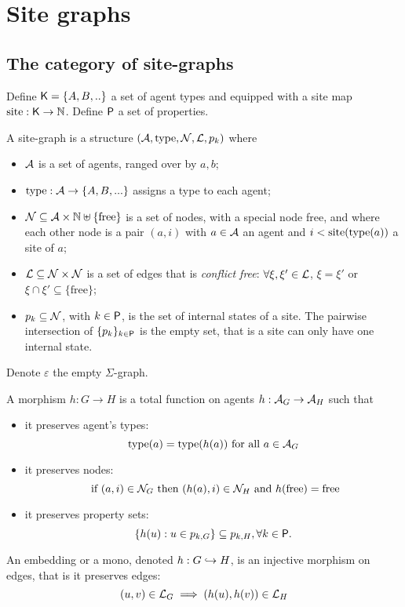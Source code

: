 \section{Site graphs}

\subsection{The category of site-graphs}

Define $\mathsf{K} = \{A, B,..\}$ a set of agent types %
and equipped with a site map $\operatorname{site}:\mathsf{K}\to\mathbb{N}$.
Define $\mathsf{P}$ a set of properties.


\begin{definition}
\label{def:site_graphs}
A site-graph is a structure $(\mathcal{A},\operatorname{type},\mathcal{N},\mathcal{L},p_k)$ where
\begin{itemize}
\item $\mathcal{A}$ is a set of agents, ranged over by $a,b$;
\item $\operatorname{type}:\mathcal{A}\to \{A, B,...\}$ assigns a type to each agent;
\item $\mathcal{N}\subseteq \mathcal{A}\times\mathbb{N}\uplus\{\text{free}\}$ is a set of nodes, with a special node free, and where each other node is a pair $(a,i)$ with $a\in\mathcal{A}$ an agent and $i<\operatorname{site}(\operatorname{type}(a))$ a site of $a$;
\item $\mathcal{L}\subseteq \mathcal{N}\times\mathcal{N}$ is a set of edges that is \emph{conflict free}: $\forall \xi,\xi'\in\mathcal{L}$, $\xi=\xi'$ or $\xi\cap \xi' \subseteq \{\text{free}\}$;
\item $p_k\subseteq\mathcal{N}$, with $k\in\mathsf{P}$, is the set of internal states of a site. The pairwise intersection of $\{p_k\}_{k\in\mathsf{P}}$ is the empty set, that is a site can only have one internal state.
\end{itemize}
Denote $\varepsilon$ the empty $\Sigma$-graph.
\end{definition}

\begin{definition}[Morphisms]
\label{def:site_morph}
A morphism $h:G\to H$ is a total function on agents $h:\mathcal{A}_G\to\mathcal{A}_H$ such that
\begin{itemize}
\item it preserves agent's types:
\[
\operatorname{type}(a) = \operatorname{type}(h(a)) \text{ for all }a \in \mathcal{A}_G
\]
\item it preserves nodes:
\[
\text{ if }(a,i)\in \mathcal{N}_G \text{ then }(h(a),i) \in \mathcal{N}_H\text{ and }h(\text{free})=\text{free}
\]
\item it preserves property sets:
\[
\{h(u) : u\in p_{k,G}\} \subseteq p_{k,H}, \forall k\in\mathsf{P}.
\]
\end{itemize}
An embedding or a mono, denoted $h:G\hookrightarrow H$, is an injective morphism on edges, that is it preserves edges:
\[
(u,v)\in\mathcal{L}_G \implies (h(u),h(v))\in\mathcal{L}_H
\]
\end{definition}

